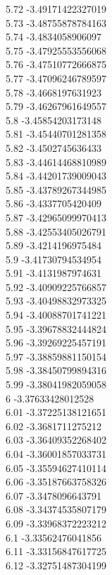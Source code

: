 {5.72	-3.49171422327019\\
5.73	-3.48755878784163\\
5.74	-3.4834058906097\\
5.75	-3.47925553556068\\
5.76	-3.47510772666875\\
5.77	-3.47096246789597\\
5.78	-3.4668197631923\\
5.79	-3.46267961649557\\
5.8	-3.45854203173148\\
5.81	-3.45440701281358\\
5.82	-3.4502745636433\\
5.83	-3.44614468810989\\
5.84	-3.44201739009043\\
5.85	-3.43789267344985\\
5.86	-3.4337705420409\\
5.87	-3.42965099970413\\
5.88	-3.42553405026791\\
5.89	-3.4214196975484\\
5.9	-3.41730794534954\\
5.91	-3.4131987974631\\
5.92	-3.40909225766857\\
5.93	-3.40498832973325\\
5.94	-3.40088701741221\\
5.95	-3.39678832444824\\
5.96	-3.39269225457191\\
5.97	-3.38859881150154\\
5.98	-3.38450799894316\\
5.99	-3.38041982059058\\
6	-3.37633428012528\\
6.01	-3.37225138121651\\
6.02	-3.3681711275212\\
6.03	-3.36409352268402\\
6.04	-3.36001857033731\\
6.05	-3.35594627410114\\
6.06	-3.35187663758326\\
6.07	-3.3478096643791\\
6.08	-3.34374535807179\\
6.09	-3.33968372223212\\
6.1	-3.33562476041856\\
6.11	-3.33156847617725\\
6.12	-3.32751487304199\\
}
